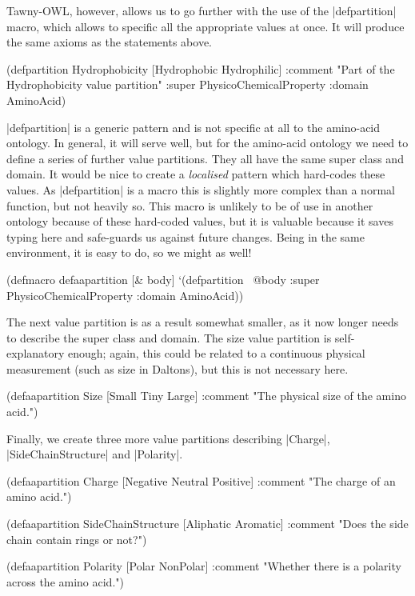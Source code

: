 Tawny-OWL, however, allows us to go further with the use of the |defpartition|
macro, which allows to specific all the appropriate values at once. It will
produce the same axioms as the statements above.

\begin{tawny}
(defpartition Hydrophobicity
  [Hydrophobic Hydrophilic]
  :comment "Part of the Hydrophobicity value partition"
  :super PhysicoChemicalProperty
  :domain AminoAcid)
\end{tawny}

|defpartition| is a generic pattern and is not specific at all to the
amino-acid ontology. In general, it will serve well, but for the amino-acid
ontology we need to define a series of further value partitions. They all have
the same super class and domain. It would be nice to create a \emph{localised}
pattern which hard-codes these values. As |defpartition| is a macro this is
slightly more complex than a normal function, but not heavily so. This macro
is unlikely to be of use in another ontology because of these hard-coded
values, but it is valuable because it saves typing here and safe-guards us
against future changes. Being in the same environment, it is easy to do, so we
might as well!

\begin{tawny}
(defmacro defaapartition [& body]
  `(defpartition
     ~@body :super PhysicoChemicalProperty
     :domain AminoAcid))
\end{tawny}

The next value partition is as a result somewhat smaller, as it now longer
needs to describe the super class and domain. The size value partition is
self-explanatory enough; again, this could be related to a continuous physical
measurement (such as size in Daltons), but this is not necessary here.

\begin{tawny}
(defaapartition Size
  [Small Tiny Large]
  :comment "The physical size of the amino acid.")
\end{tawny}

Finally, we create three more value partitions describing |Charge|,
|SideChainStructure| and |Polarity|.

\begin{tawny}
(defaapartition Charge
  [Negative Neutral Positive]
  :comment "The charge of an amino acid.")

(defaapartition SideChainStructure
  [Aliphatic Aromatic]
  :comment "Does the side chain contain rings or not?")

(defaapartition Polarity
  [Polar NonPolar]
  :comment "Whether there is a polarity across the amino acid.")
\end{tawny}

